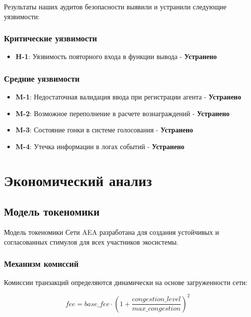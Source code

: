 \documentclass[12pt,a4paper]{article}
\begin{document}
Результаты наших аудитов безопасности выявили и устранили следующие уязвимости:

\subsubsection{Критические уязвимости}
\begin{itemize}
\item \textbf{H-1}: Уязвимость повторного входа в функции вывода - \textbf{Устранено}
\end{itemize}

\subsubsection{Средние уязвимости}
\begin{itemize}
\item \textbf{M-1}: Недостаточная валидация ввода при регистрации агента - \textbf{Устранено}
\item \textbf{M-2}: Возможное переполнение в расчете вознаграждений - \textbf{Устранено}
\item \textbf{M-3}: Состояние гонки в системе голосования - \textbf{Устранено}
\item \textbf{M-4}: Утечка информации в логах событий - \textbf{Устранено}
\end{itemize}

\section{Экономический анализ}

\subsection{Модель токеномики}

Модель токеномики Сети AEA разработана для создания устойчивых и согласованных стимулов для всех участников экосистемы.

\subsubsection{Механизм комиссий}

Комиссии транзакций определяются динамически на основе загруженности сети:

\begin{equation}
fee = base\_fee \cdot (1 + \frac{congestion\_level}{max\_congestion})^2
\end{equation}
\end{document}
